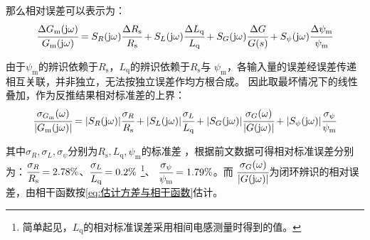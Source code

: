 那么相对误差可以表示为：
\begin{equation*}
    \cfrac{\Delta G_{\mathrm{m}}(\mathrm{j}\omega)}{G_{\mathrm{m}}(\mathrm{j}\omega)}=
    S_{R}(\mathrm{j}\omega)\cfrac{\Delta R_{\mathrm{s}}}{R_{\mathrm{s}}}
    +S_{L}(\mathrm{j}\omega)\cfrac{\Delta L_{\mathrm{q}}}{L_{\mathrm{q}}}
    +S_{G}(\mathrm{j}\omega)\cfrac{\Delta G}{G(s)}
    +S_{\psi}(\mathrm{j}\omega)\cfrac{\Delta \psi_{\mathrm{m}}}{\psi_{\mathrm{m}}}
\end{equation*}

由于\(\psi_{\mathrm{m}}\)的辨识依赖于\(R_{\mathrm{s}}\)，\(L_{\mathrm{q}}\)的辨识依赖于\(R_{\mathrm{s}}\)与
\(\psi_{\mathrm{m}}\)，各输入量的误差经误差传递相互关联，并非独立，无法按独立误差作均方根合成。
因此取最坏情况下的线性叠加，作为反推结果相对标准差的上界：
\begin{equation}
    \cfrac{\sigma_{G_{\mathrm{m}}}(\omega)}{|G_{\mathrm{m}}(\mathrm{j}\omega)|}
    =|S_R(\mathrm{j}\omega)|\cfrac{\sigma_R}{R_{\mathrm{s}}}
    +|S_L(\mathrm{j}\omega)|\cfrac{\sigma_L}{L_{\mathrm{q}}}
    +|S_G(\mathrm{j}\omega)|\cfrac{\sigma_G(\omega)}{|G(\mathrm{j}\omega)|}
    +|S_\psi(\mathrm{j}\omega)|\cfrac{\sigma_\psi}{\psi_{\mathrm{m}}}
    \label{eq:标准差上界}
\end{equation}

其中\(\sigma_R,\sigma_L,\sigma_\psi\)分别为\(R_{\mathrm{s}},L_{\mathrm{q}},\psi_{\mathrm{m}}\)的标准差
，根据前文数据可得相对标准误差分别为：\(\cfrac{\sigma_R}{R_{\mathrm{s}}}=2.78\%\)、\(\cfrac{\sigma_L}{L_{\mathrm{q}}}=0.2\%\)
\footnote{简单起见，\(L_{\mathrm{q}}\)的相对标准误差采用相间电感测量时得到的值。}、
\(\cfrac{\sigma_\psi}{\psi_{\mathrm{m}}}=1.79\%\)。而
\(\cfrac{\sigma_G(\omega)}{|G(\mathrm{j}\omega)|}\)为闭环辨识的相对误差，由相干函数按\eqref{eq:估计方差与相干函数}估计。

